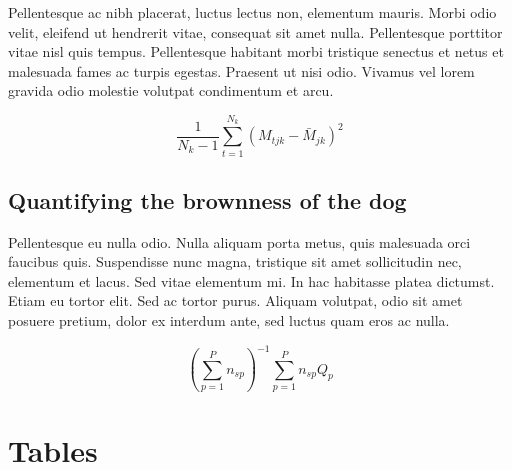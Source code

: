 \documentclass[11pt]{article}
\begin{document}
Pellentesque ac nibh placerat, luctus lectus non, elementum mauris. 
Morbi odio velit, eleifend ut hendrerit vitae, consequat sit amet 
nulla. Pellentesque porttitor vitae nisl quis tempus. Pellentesque 
habitant morbi tristique senectus et netus et malesuada fames ac 
turpis egestas. Praesent ut nisi odio. Vivamus vel lorem gravida 
odio molestie volutpat condimentum et arcu. 

\begin{equation}
{ \frac{1}{N_k-1} \sum \limits_{t=1}^{N_k} (M_{tjk} - \bar{M}_{jk})^2}
\end{equation}

\subsection*{Quantifying the brownness of the dog}

Pellentesque eu nulla odio. Nulla aliquam porta metus, quis malesuada orci faucibus quis. Suspendisse nunc magna, tristique sit amet sollicitudin nec, elementum et lacus. Sed vitae elementum mi. In hac habitasse platea dictumst. Etiam eu tortor elit. Sed ac tortor purus. Aliquam volutpat, odio sit amet posuere pretium, dolor ex interdum ante, sed luctus quam eros ac nulla. 

\begin{equation}
{ (\sum \limits_{p=1}^P {n_{sp}})^{-1}\sum \limits_{p=1}^P {n_{sp}Q_{p}}}
\end{equation}

\newpage{}

%
%


\newpage{}

\section*{Tables}
\renewcommand{\thetable}{\arabic{table}}
\setcounter{table}{0}
\end{document}
